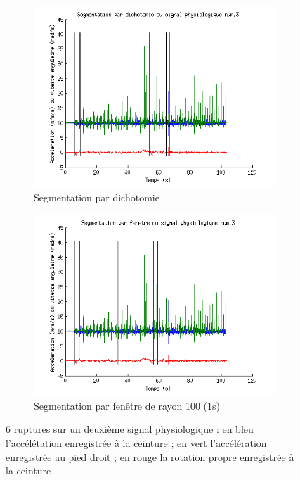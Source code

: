 \documentclass[french,11pt,notitlepage]{report}
\begin{document}
	\begin{figure}[hp]
		\begin{subfigure}[t]{.49\textwidth}
		  \includegraphics[width=\linewidth,height=.25\textheight]{phys3_dikt}
			\caption{Segmentation par dichotomie}
			\label{}
		\end{subfigure}
		\hfill
		\begin{subfigure}[t]{.49\textwidth}
			\includegraphics[width=\linewidth,height=.25\textheight]{phys3_mid}
			\caption{Segmentation par fenêtre de rayon 100 (1s)}
			\label{}
		\end{subfigure}
	\caption{6 ruptures sur un deuxième signal physiologique : en bleu l'accélétation enregistrée à la ceinture ; en vert l'accélération enregistrée au pied droit ; en rouge la rotation propre enregistrée à la ceinture}
	\label{score_min}
	\end{figure}
	
\end{document}
